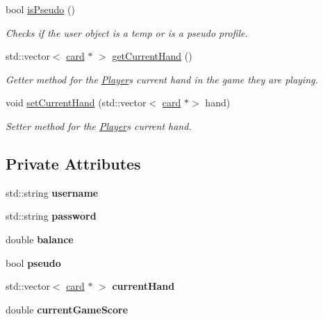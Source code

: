 \begin{DoxyCompactItemize}
bool \hyperlink{classPlayer_a50aa73eae22ec3435d3de2e556bd1fec}{is\+Pseudo} ()
\begin{DoxyCompactList}\small\item\em Checks if the user object is a temp or is a pseudo profile. \end{DoxyCompactList}\item 
std\+::vector$<$ \hyperlink{classcard}{card} $\ast$ $>$ \hyperlink{classPlayer_a5117d4863ff28cd0bf522cfe34995c27}{get\+Current\+Hand} ()
\begin{DoxyCompactList}\small\item\em Getter method for the \hyperlink{classPlayer}{Player}\textquotesingle{}s current hand in the game they are playing. \end{DoxyCompactList}\item 
void \hyperlink{classPlayer_a8a4e0a62953bad66dd6dd18f28619ead}{set\+Current\+Hand} (std\+::vector$<$ \hyperlink{classcard}{card} $\ast$$>$ hand)
\begin{DoxyCompactList}\small\item\em Setter method for the \hyperlink{classPlayer}{Player}\textquotesingle{}s current hand. \end{DoxyCompactList}\end{DoxyCompactItemize}
\subsection*{Private Attributes}
\begin{DoxyCompactItemize}
\item 
\mbox{\label{classPlayer_af6823e27c17ba6ed5d2b4713abbe4d5a}} 
std\+::string {\bfseries username}
\item 
\mbox{\label{classPlayer_a62136f186be055500d69c835d8593f39}} 
std\+::string {\bfseries password}
\item 
\mbox{\label{classPlayer_a13f91e1079f0a76f2e8fb8aaa421b9b6}} 
double {\bfseries balance}
\item 
\mbox{\label{classPlayer_a8737097eeb7a21cfe36e6a873ca0db28}} 
bool {\bfseries pseudo}
\item 
\mbox{\label{classPlayer_ae520913dfc9e2939dcc23bb3a3a97741}} 
std\+::vector$<$ \hyperlink{classcard}{card} $\ast$ $>$ {\bfseries current\+Hand}
\item 
\mbox{\label{classPlayer_a6d6dacc63c26bba93641fabc50997259}} 
double {\bfseries current\+Game\+Score}
\end{DoxyCompactItemize}



